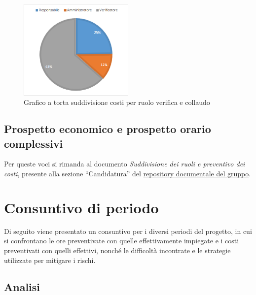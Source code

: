 \begin{figure}[H]
    \centering
    \includegraphics[width=0.5\textwidth]{images/torta_collaudo.png}
    \caption{Grafico a torta suddivisione costi per ruolo verifica e collaudo}
    \label{fig:torta_collaudo}
\end{figure}

\subsection{Prospetto economico e prospetto orario complessivi}\label{sec:preventivo:totale}
Per queste voci si rimanda al documento \textit{Suddivisione dei ruoli e preventivo dei  costi}, presente alla sezione ``Candidatura'' del \href{https://avant-garde-software-engineering.github.io/documentazione.html}{repository documentale del gruppo}.



\newpage
\section{Consuntivo di periodo}\label{sec:consuntivo}

Di seguito viene presentato un consuntivo per i diversi periodi del progetto, in cui si confrontano le ore preventivate con quelle effettivamente impiegate e i costi preventivati con quelli effettivi, nonché le difficoltà incontrate e le strategie utilizzate per mitigare i rischi.\\

\subsection{Analisi}\label{sec:consuntivo:analisi}

